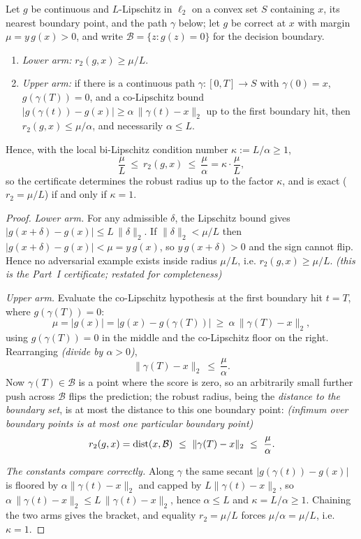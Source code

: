 \begin{theorem}
\label{thm:sandwich}
Let $g$ be continuous and $L$-Lipschitz in $\ell_2$ on a convex set $S$ containing $x$, its nearest
boundary point, and the path $\gamma$ below; let $g$ be correct at $x$ with margin
$\mu = y\,g(x) > 0$, and write $\mathcal B = \{z : g(z) = 0\}$ for the decision boundary.
\begin{enumerate}[leftmargin=1.7em,label=\textup{(\roman*)}]
\item \emph{Lower arm:} $r_2(g,x) \ge \mu/L$.
\item \emph{Upper arm:} if there is a continuous path $\gamma:[0,T]\to S$ with $\gamma(0)=x$,
$g(\gamma(T))=0$, and a co-Lipschitz bound $|g(\gamma(t)) - g(x)| \ge \alpha\,\|\gamma(t)-x\|_2$ up to
the first boundary hit, then $r_2(g,x) \le \mu/\alpha$, and necessarily $\alpha \le L$.
\end{enumerate}
Hence, with the local bi-Lipschitz condition number $\kappa := L/\alpha \ge 1$,
\[
\frac{\mu}{L} \ \le\ r_2(g,x) \ \le\ \frac{\mu}{\alpha} = \kappa\cdot\frac{\mu}{L},
\]
so the certificate determines the robust radius up to the factor $\kappa$, and is exact
($r_2 = \mu/L$) if and only if $\kappa = 1$.
\end{theorem}

\begin{proof}
\emph{Lower arm.}
For any admissible $\delta$, the Lipschitz bound gives
$|g(x+\delta) - g(x)| \le L\,\|\delta\|_2$. If $\|\delta\|_2 < \mu/L$ then
$|g(x+\delta) - g(x)| < \mu = y\,g(x)$, so $y\,g(x+\delta) > 0$ and the sign cannot flip. Hence no
adversarial example exists inside radius $\mu/L$, i.e. $r_2(g,x) \ge \mu/L$. \emph{(this is the
Part~I certificate; restated for completeness)}

\emph{Upper arm.}
Evaluate the co-Lipschitz hypothesis at the first boundary hit $t = T$, where $g(\gamma(T)) = 0$:
\[
\mu = |g(x)| = |g(x) - g(\gamma(T))| \ \ge\ \alpha\,\|\gamma(T) - x\|_2,
\]
using $g(\gamma(T))=0$ in the middle and the co-Lipschitz floor on the right. Rearranging \emph{(divide
by $\alpha>0$)},
\[
\|\gamma(T) - x\|_2 \ \le\ \frac{\mu}{\alpha}.
\]
Now $\gamma(T) \in \mathcal B$ is a point where the score is zero, so an arbitrarily small further push
across $\mathcal B$ flips the prediction; the robust radius, being the \emph{distance to the boundary
set}, is at most the distance to this one boundary point: \emph{(infimum over boundary points is at
most one particular boundary point)}
\[
r_2(g,x) = \operatorname{dist}(x,\mathcal B) \ \le\ \|\gamma(T) - x\|_2 \ \le\ \frac{\mu}{\alpha}.
\]

\emph{The constants compare correctly.}
Along $\gamma$ the same secant $|g(\gamma(t)) - g(x)|$ is floored by $\alpha\|\gamma(t)-x\|_2$ and
capped by $L\|\gamma(t)-x\|_2$, so $\alpha\,\|\gamma(t)-x\|_2 \le L\,\|\gamma(t)-x\|_2$, hence
$\alpha \le L$ and $\kappa = L/\alpha \ge 1$. Chaining the two arms gives the bracket, and equality
$r_2 = \mu/L$ forces $\mu/\alpha = \mu/L$, i.e. $\kappa = 1$.
\end{proof}

